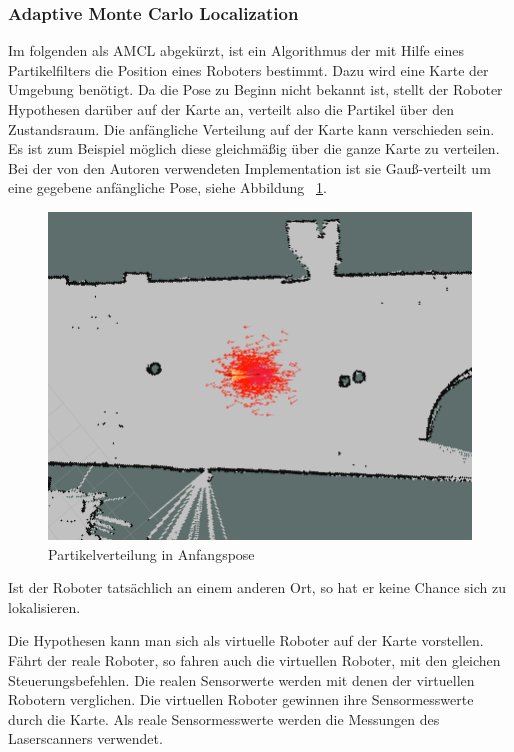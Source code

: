 \documentclass[11pt,a4paper]{article}
\begin{document}
\subsubsection{Adaptive Monte Carlo Localization \cite{mclWiki} \cite{amclPaper}} 
{
	Im folgenden als AMCL abgek\"urzt, ist ein Algorithmus der mit Hilfe eines Partikelfilters die Position eines Roboters bestimmt. Dazu wird eine Karte der Umgebung ben\"otigt. Da die Pose zu Beginn nicht bekannt ist, stellt der Roboter Hypothesen dar\"uber auf der Karte an, verteilt also die Partikel \"uber den Zustandsraum. Die anf\"angliche Verteilung auf der Karte kann verschieden sein. Es ist zum Beispiel m\"oglich diese  gleichm\"a{\ss}ig über die ganze Karte zu verteilen. 
	Bei der von den Autoren verwendeten Implementation ist sie Gau{\ss}-verteilt um eine gegebene anf\"angliche Pose, siehe Abbildung ~\ref{fig:initalParticleDistribution}. \begin{figure}[h]
		\includegraphics[width=\linewidth]{pictures/initial_distribution.jpg}
		\caption{Partikelverteilung in Anfangspose \label{fig:initalParticleDistribution}}
	\end{figure}
	\newpage
	Ist der Roboter tats\"achlich an einem anderen Ort, so hat er keine Chance sich zu lokalisieren. 
	
	Die Hypothesen kann man sich als virtuelle Roboter auf der Karte vorstellen. F\"ahrt der reale Roboter, so fahren auch die virtuellen Roboter, mit den gleichen Steuerungsbefehlen. Die realen Sensorwerte werden mit denen der virtuellen Robotern verglichen. Die virtuellen Roboter gewinnen ihre Sensormesswerte durch die Karte. Als reale Sensormesswerte werden die Messungen des Laserscanners verwendet. 
	
}
\end{document}
